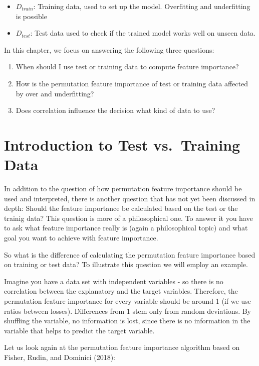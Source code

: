 \documentclass[]{krantz}
\begin{document}
\begin{itemize}
\item
  \(D_{train}\): Training data, used to set up the model. Overfitting
  and underfitting is possible
\item
  \(D_{test}\): Test data used to check if the trained model works well
  on unseen data.
\end{itemize}

In this chapter, we focus on answering the following three questions:

\begin{enumerate}
\def\labelenumi{\arabic{enumi}.}
\item
  When should I use test or training data to compute feature importance?
\item
  How is the permutation feature importance of test or training data
  affected by over and underfitting?
\item
  Does correlation influence the decision what kind of data to use?
\end{enumerate}

\section{Introduction to Test vs.~Training
Data}\label{introduction-to-test-vs.training-data}

In addition to the question of how permutation feature importance should
be used and interpreted, there is another question that has not yet been
discussed in depth: Should the feature importance be calculated based on
the test or the trainig data? This question is more of a philosophical
one. To answer it you have to ask what feature importance really is
(again a philosophical topic) and what goal you want to achieve with
feature importance.

So what is the difference of calculating the permutation feature
importance based on training or test data? To illustrate this question
we will employ an example.

Imagine you have a data set with independent variables - so there is no
correlation between the explanatory and the target variables. Therefore,
the permutation feature importance for every variable should be around 1
(if we use ratios between losses). Differences from \(1\) stem only from
random deviations. By shuffling the variable, no information is lost,
since there is no information in the variable that helps to predict the
target variable.

Let us look again at the permutation feature importance algorithm based
on Fisher, Rudin, and Dominici (2018):
\end{document}
